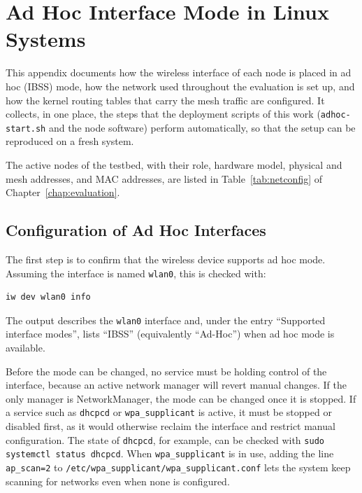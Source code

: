 
\chapter{Ad Hoc Interface Mode in Linux Systems}
\label{app:adhoc}

This appendix documents how the wireless interface of each node is placed in
ad hoc (IBSS) mode, how the network used throughout the evaluation is set up, and
how the kernel routing tables that carry the mesh traffic are configured. It
collects, in one place, the steps that the deployment scripts of this work
(\texttt{adhoc-start.sh} and the node software) perform automatically, so that
the setup can be reproduced on a fresh system.

The active nodes of the testbed, with their role, hardware model, physical and
mesh addresses, and MAC addresses, are listed in Table~\ref{tab:netconfig} of
Chapter~\ref{chap:evaluation}.

\section{Configuration of Ad Hoc Interfaces}
\label{sec:app-config}

The first step is to confirm that the wireless device supports ad hoc mode.
Assuming the interface is named \texttt{wlan0}, this is checked with:

\begin{lstlisting}[language=bash,caption={Checking whether the wireless interface supports ad hoc mode},label=lst:app-iwinfo]
iw dev wlan0 info
\end{lstlisting}

The output describes the \texttt{wlan0} interface and, under the entry
``Supported interface modes'', lists ``IBSS'' (equivalently ``Ad-Hoc'') when ad
hoc mode is available.

Before the mode can be changed, no service must be holding control of the
interface, because an active network manager will revert manual changes. If the
only manager is NetworkManager, the mode can be changed once it is stopped. If a
service such as \texttt{dhcpcd} or \texttt{wpa\_supplicant} is active, it must be
stopped or disabled first, as it would otherwise reclaim the interface and
restrict manual configuration. The state of \texttt{dhcpcd}, for example, can be
checked with \texttt{sudo systemctl status dhcpcd}. When \texttt{wpa\_supplicant}
is in use, adding the line \texttt{ap\_scan=2} to
\texttt{/etc/wpa\_supplicant/wpa\_supplicant.conf} lets the system keep scanning
for networks even when none is configured.

